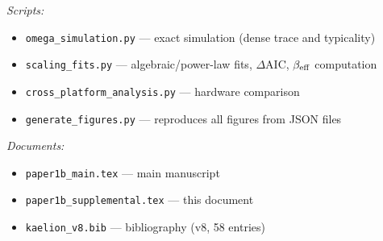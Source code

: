 \documentclass[twocolumn,showpacs,preprintnumbers,amsmath,amssymb,aps,prl]{revtex4-2}
\begin{document}
\textit{Scripts:}
\begin{itemize}
  \item \texttt{omega\_simulation.py} --- exact simulation (dense trace and
    typicality)
  \item \texttt{scaling\_fits.py} --- algebraic/power-law fits, $\Delta$AIC,
    $\beta_{\rm eff}$ computation
  \item \texttt{cross\_platform\_analysis.py} --- hardware comparison
  \item \texttt{generate\_figures.py} --- reproduces all figures from JSON files
\end{itemize}

\textit{Documents:}
\begin{itemize}
  \item \texttt{paper1b\_main.tex} --- main manuscript
  \item \texttt{paper1b\_supplemental.tex} --- this document
  \item \texttt{kaelion\_v8.bib} --- bibliography (v8, 58 entries)
\end{itemize}


\end{document}
